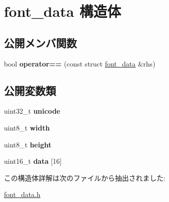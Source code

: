 \hypertarget{structfont__data}{}\section{font\+\_\+data 構造体}
\label{structfont__data}
\subsection*{公開メンバ関数}
\begin{DoxyCompactItemize}
\item 
\hypertarget{structfont__data_a739d3ba2d2f02aac83105043a0eba641}{}\label{structfont__data_a739d3ba2d2f02aac83105043a0eba641} 
bool {\bfseries operator==} (const struct \hyperlink{structfont__data}{font\+\_\+data} \&rhs)
\end{DoxyCompactItemize}
\subsection*{公開変数類}
\begin{DoxyCompactItemize}
\item 
\hypertarget{structfont__data_a4ee6887326fab44ed8adc0e4a33a8b1b}{}\label{structfont__data_a4ee6887326fab44ed8adc0e4a33a8b1b} 
uint32\+\_\+t {\bfseries unicode}
\item 
\hypertarget{structfont__data_a9f7e5e4e4b681c3361ddceb4e45643f1}{}\label{structfont__data_a9f7e5e4e4b681c3361ddceb4e45643f1} 
uint8\+\_\+t {\bfseries width}
\item 
\hypertarget{structfont__data_a4f43296d75ddb591b3688ef75ce2bc78}{}\label{structfont__data_a4f43296d75ddb591b3688ef75ce2bc78} 
uint8\+\_\+t {\bfseries height}
\item 
\hypertarget{structfont__data_a8952da2039b6c55eb723f7bfa96fb90e}{}\label{structfont__data_a8952da2039b6c55eb723f7bfa96fb90e} 
uint16\+\_\+t {\bfseries data} \mbox{[}16\mbox{]}
\end{DoxyCompactItemize}


この構造体詳解は次のファイルから抽出されました\+:\begin{DoxyCompactItemize}
\item 
\hyperlink{font__data_8h}{font\+\_\+data.\+h}\end{DoxyCompactItemize}
